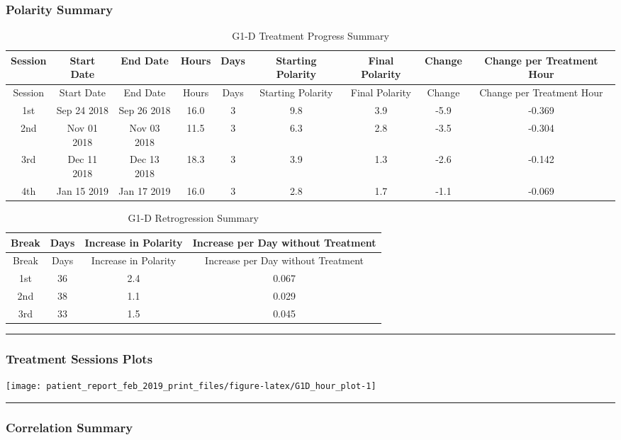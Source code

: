\documentclass[]{article}
\begin{document}
\subsubsection{Polarity Summary}\label{polarity-summary-5}

\begin{longtable}[]{@{}ccccccccc@{}}
\caption{G1-D Treatment Progress Summary}\tabularnewline
\toprule
Session & Start Date & End Date & Hours & Days & Starting Polarity &
Final Polarity & Change & Change per Treatment Hour\tabularnewline
\midrule
\endfirsthead
\toprule
Session & Start Date & End Date & Hours & Days & Starting Polarity &
Final Polarity & Change & Change per Treatment Hour\tabularnewline
\midrule
\endhead
1st & Sep 24 2018 & Sep 26 2018 & 16.0 & 3 & 9.8 & 3.9 & -5.9 &
-0.369\tabularnewline
2nd & Nov 01 2018 & Nov 03 2018 & 11.5 & 3 & 6.3 & 2.8 & -3.5 &
-0.304\tabularnewline
3rd & Dec 11 2018 & Dec 13 2018 & 18.3 & 3 & 3.9 & 1.3 & -2.6 &
-0.142\tabularnewline
4th & Jan 15 2019 & Jan 17 2019 & 16.0 & 3 & 2.8 & 1.7 & -1.1 &
-0.069\tabularnewline
\bottomrule
\end{longtable}

\begin{longtable}[]{@{}cccc@{}}
\caption{G1-D Retrogression Summary}\tabularnewline
\toprule
Break & Days & Increase in Polarity & Increase per Day without
Treatment\tabularnewline
\midrule
\endfirsthead
\toprule
Break & Days & Increase in Polarity & Increase per Day without
Treatment\tabularnewline
\midrule
\endhead
1st & 36 & 2.4 & 0.067\tabularnewline
2nd & 38 & 1.1 & 0.029\tabularnewline
3rd & 33 & 1.5 & 0.045\tabularnewline
\bottomrule
\end{longtable}

\begin{center}\rule{0.5\linewidth}{\linethickness}\end{center}

\subsubsection{Treatment Sessions
Plots}\label{treatment-sessions-plots-5}

\texttt{[image: patient\_report\_feb\_2019\_print\_files/figure-latex/G1D\_hour\_plot-1]}

\begin{center}\rule{0.5\linewidth}{\linethickness}\end{center}

\subsubsection{Correlation Summary}\label{correlation-summary-5}
\end{document}
